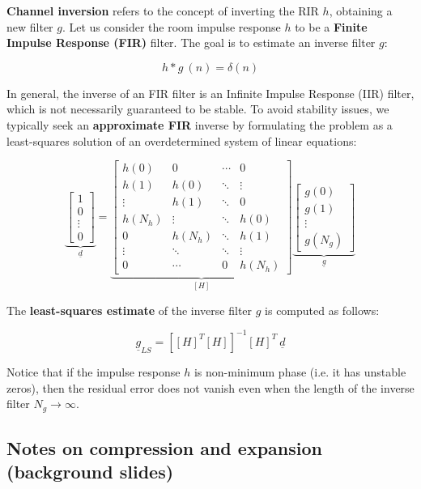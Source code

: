 \textbf{Channel inversion} refers to the concept of inverting the RIR $h$, obtaining a new filter $g$.
Let us consider the room impulse response $h$ to be a \textbf{Finite Impulse Response (FIR)} filter.
The goal is to estimate an inverse filter $g$:

\[
h \ast g \ (n) = \delta(n)
\]

In general, the inverse of an FIR filter is an Infinite Impulse Response (IIR) filter, which is not necessarily guaranteed to be stable.
To avoid stability issues, we typically seek an \textbf{approximate FIR} inverse by formulating the problem as a least-squares solution of an overdetermined system of linear equations:

\[
\underbrace{
\begin{bmatrix}
1 \\ 0 \\ \vdots \\ 0
\end{bmatrix}}_{\underline{d}}=
\underbrace{
\begin{bmatrix}
h(0) & 0 & \cdots & 0 \\
h(1) & h(0) & \ddots & \vdots \\
\vdots & h(1) & \ddots & 0 \\
h(N_h) & \vdots & \ddots & h(0) \\
0 & h(N_h) & \ddots & h(1) \\
\vdots & \ddots & \ddots & \vdots \\
0 & \cdots & 0 & h(N_h)
\end{bmatrix}}_{\left[ H \right]}
\underbrace{
\begin{bmatrix}
g(0) \\ g(1) \\ \vdots \\ g(N_g)
\end{bmatrix}}_{\underline{g}}
\]

The \textbf{least-squares estimate} of the inverse filter $g$ is computed as follows:

\[
\underline{g}_{LS} = \left[ \left[ H \right]^T \left[ H \right] \right]^{-1} \left[ H \right]^T \ \underline{d}
\]

Notice that if the impulse response $h$ is non-minimum phase (i.e. it has unstable zeros), then the residual error does not vanish even when the length of the inverse filter $N_g \to \infty$.


\subsection{Notes on compression and expansion (background slides)}

